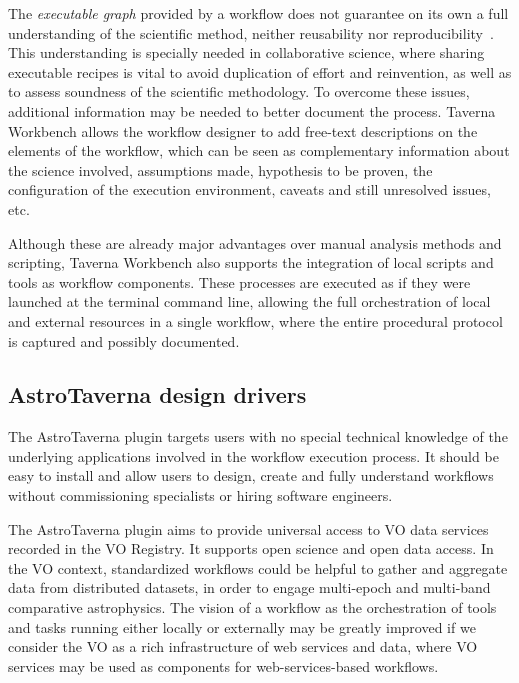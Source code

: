 \documentclass{aa}
\begin{document}
The \textit{executable graph} provided by a workflow does not guarantee on its own a full understanding of the scientific method, neither reusability nor reproducibility~\citep{WfRO:SePublica2012}. This understanding is specially needed in collaborative science, where sharing executable recipes is vital to avoid duplication of effort and reinvention, as well as to assess soundness of the scientific methodology. To overcome these issues, additional information may be needed to better document the process. Taverna Workbench allows the workflow designer to add free-text descriptions on the elements of the workflow, which can be seen as complementary information about the science involved, assumptions made, hypothesis to be proven, the configuration of the execution environment, caveats and still unresolved issues, etc.

Although these are already major advantages over manual analysis methods and scripting, Taverna Workbench also supports the integration of local scripts and tools as workflow components. These processes are executed as if they were launched at the terminal command line, allowing the full orchestration of local and external resources in a single workflow, where the entire procedural protocol is captured and possibly documented. 


\subsection{AstroTaverna design drivers}
\label{Drivers}

The AstroTaverna plugin targets users with no special technical knowledge of the underlying applications involved in the workflow execution process. It should be easy to install and allow users to design, create and fully understand workflows without commissioning specialists or hiring software engineers. 

The AstroTaverna plugin aims to provide universal access to VO data services recorded in the VO Registry. It supports open science and open data access. In the VO context, standardized workflows could be helpful to gather and aggregate data from distributed datasets, in order to engage multi-epoch and multi-band comparative astrophysics. The vision of a workflow as the orchestration of tools and tasks running either locally or externally may be greatly improved if we consider the VO as a rich infrastructure of web services and data, where VO services may be used as components for web-services-based workflows. 
\end{document}
